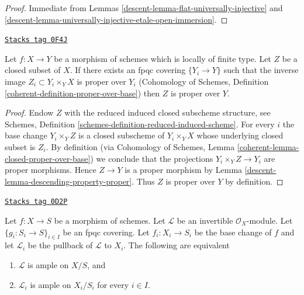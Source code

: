 \begin{proof}

Immediate from Lemmas \ref{descent-lemma-flat-universally-injective} and
\ref{descent-lemma-universally-injective-etale-open-immersion}.
\end{proof}

\begin{lemma}
\label{descent-lemma-descending-property-proper-over-base}
\href{https://stacks.math.columbia.edu/tag/0F4J}{\texttt{Stacks tag 0F4J}}

Let $f : X \to Y$ be a morphism of schemes which is locally of finite type.
Let $Z$ be a closed subset of $X$. If there exists an fpqc covering
$\{Y_i \to Y\}$ such that the inverse image $Z_i \subset Y_i \times_Y X$
is proper over $Y_i$
(Cohomology of Schemes, Definition \ref{coherent-definition-proper-over-base})
then $Z$ is proper over $Y$.
\end{lemma}

\begin{proof}

Endow $Z$ with the reduced induced closed subscheme structure, see
Schemes, Definition \ref{schemes-definition-reduced-induced-scheme}.
For every $i$ the base change $Y_i \times_Y Z$ is a closed subscheme
of $Y_i \times_Y X$ whose underlying closed subset is $Z_i$.
By definition (via
Cohomology of Schemes, Lemma \ref{coherent-lemma-closed-proper-over-base})
we conclude that the projections $Y_i \times_Y Z \to Y_i$ are proper
morphisms. Hence $Z \to Y$ is a proper morphism by
Lemma \ref{descent-lemma-descending-property-proper}.
Thus $Z$ is proper over $Y$ by definition.
\end{proof}

\begin{lemma}
\label{descent-lemma-descending-property-ample}
\href{https://stacks.math.columbia.edu/tag/0D2P}{\texttt{Stacks tag 0D2P}}

Let $f : X \to S$ be a morphism of schemes.
Let $\mathcal{L}$ be an invertible $\mathcal{O}_X$-module.
Let $\{g_i : S_i \to S\}_{i \in I}$ be an fpqc covering.
Let $f_i : X_i \to S_i$ be the base change of $f$ and let $\mathcal{L}_i$
be the pullback of $\mathcal{L}$ to $X_i$.
The following are equivalent
\begin{enumerate}
\item $\mathcal{L}$ is ample on $X/S$, and
\item $\mathcal{L}_i$ is ample on $X_i/S_i$
for every $i \in I$.
\end{enumerate}
\end{lemma}

